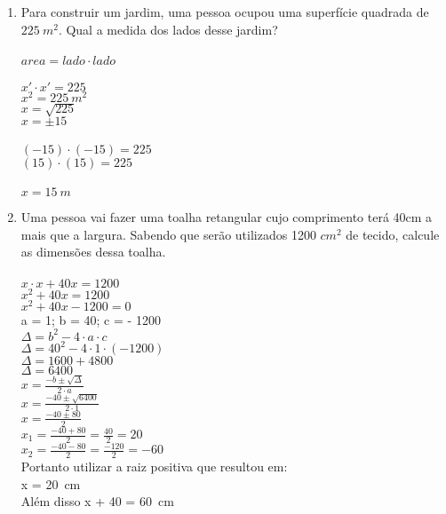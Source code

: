 \documentclass[a4paper,14pt]{article}
\begin{document}
	\begin{enumerate}
		\item Para construir um jardim, uma pessoa ocupou uma superfície quadrada de $225~m^2$. Qual a medida dos lados desse jardim?
		\\ \\
		$area = lado \cdot lado$ \\ \\
		$x' \cdot x' = 225$ \\
		$x^2 = 225~m^2$ \\
		$x = \sqrt{225}$ \\
		$x = \pm{15} $ \\
		\\
		$(-15) \cdot (-15) = 225$ \\
		$(15) \cdot (15) = 225$ \\
		\\
		$x = 15~m$
		\\
		\vspace{0cm}
		
		\item Uma pessoa vai fazer uma toalha retangular cujo comprimento terá 40cm a mais que a largura. Sabendo que serão utilizados 1200 $cm^2$ de tecido, calcule as dimensões dessa toalha.
		\\ \\
		$x \cdot x + 40x = 1200$ \\
		$x^2 + 40x = 1200$ \\
		$x^2 + 40x - 1200 = 0$ \\
		a = 1; b = 40; c = - 1200 \\
		$\Delta = b^2 - 4 \cdot a \cdot c$ \\
		$\Delta = 40^2 - 4 \cdot 1 \cdot (-1200)$ \\
		$\Delta = 1600 + 4800$ \\
		$\Delta = 6400$ \\
		$x = \frac{-b \pm{\sqrt{\Delta}}}{2 \cdot a}$ \\
		$x = \frac{-40 \pm{\sqrt{6400}}}{2 \cdot 1}$ \\
		$x = \frac{-40 \pm{80}}{2}$ \\
		$x_1 = \frac{-40 + 80}{2} = \frac{40}{2} = 20$ \\
		$x_2 = \frac{-40 - 80}{2} = \frac{-120}{2} = -60$ \\
		Portanto utilizar a raiz positiva que resultou em: \\
		x = 20~cm \\
		Além disso x + 40 = 60~cm \\


\end{enumerate}
\end{document}
